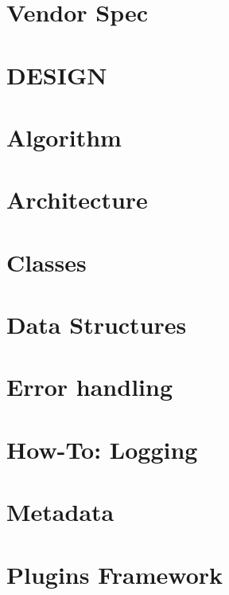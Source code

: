 \documentclass[twoside]{book}
\newcommand{\+}{\discretionary{\mbox{\scriptsize$\hookleftarrow$}}{}{}}
\begin{document}
\chapter{Vendor Spec}
\label{doc_decisions_vendor_spec_md}

\chapter{D\+E\+S\+I\+GN}
\label{doc_DESIGN_md}

\chapter{Algorithm}
\label{doc_dev_algorithm_md}

\chapter{Architecture}
\label{doc_dev_architecture_md}

\chapter{Classes}
\label{doc_dev_classes_md}

\chapter{Data Structures}
\label{doc_dev_data-structures_md}

\chapter{Error handling}
\label{doc_dev_error-handling_md}

\chapter{How-\/\+To\+: Logging}
\label{doc_dev_logging_md}

\chapter{Metadata}
\label{doc_dev_metadata_md}

\chapter{Plugins Framework}
\label{doc_dev_plugins-framework_md}

\end{document}
